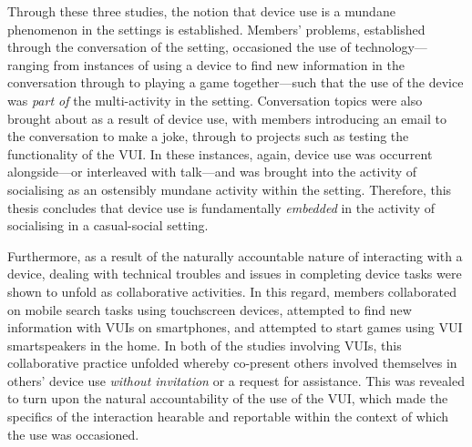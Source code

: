 \begin{revisedsubmission}
Through these three studies, the notion that device use is a mundane phenomenon in the settings is established.
Members' problems, established through the conversation of the setting, occasioned the use of technology---ranging from instances of using a device to find new information in the conversation through to playing a game together---such that the use of the device was \textit{part of} the multi-activity in the setting.
Conversation topics were also brought about as a result of device use, with members introducing an email to the conversation to make a joke, through to projects such as testing the functionality of the \ac{VUI}.
In these instances, again, device use was occurrent alongside---or interleaved with talk---and was brought into the activity of socialising as an ostensibly mundane activity within the setting.
Therefore, this thesis concludes that device use is fundamentally \textit{embedded} in the activity of socialising in a casual-social setting.

Furthermore, as a result of the naturally accountable nature of interacting with a device, dealing with technical troubles and issues in completing device tasks were shown to unfold as collaborative activities.
In this regard, members collaborated on mobile search tasks using touchscreen devices, attempted to find new information with \acp{VUI} on smartphones, and attempted to start games using \ac{VUI} smartspeakers in the home.
In both of the studies involving \acp{VUI}, this collaborative practice unfolded whereby co-present others involved themselves in others' device use \textit{without invitation} or a request for assistance.
This was revealed to turn upon the natural accountability of the use of the \ac{VUI}, which made the specifics of the interaction hearable and reportable within the context of which the use was occasioned.

\end{revisedsubmission}

